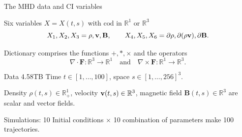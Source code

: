 \documentclass{beamer}
\begin{document}
\begin{frame}{The MHD data and CI variables }%
\begin{block}{Six variables $X = X(t,s)$ with $\text{cod}$ in $\mathbb{R}^1$ or $\mathbb{R}^3$}
\[
X_1, X_2, X_3= \rho, \mathbf{v}, \mathbf{B},
\qquad
X_4, X_5, X_6 = \partial\rho, \partial(\rho\mathbf{v}), \partial\mathbf{B}.
\]
\end{block}
\begin{block}{Dictionary}
comprises the  functions $+, *, \times$ and the operators 
\[
\nabla \cdot \mathbf{F}: \mathbb{R}^3 \to \mathbb{R}^1 \quad\text{and}\quad \nabla \times \mathbf{F}: \mathbb{R}^1 \to \mathbb{R}^3.
\]
\end{block}
\begin{block}{Data 4.58TB}
Time $t \in [1,\dots,100]$, space $s \in [1,\dots,256]^3$.  

\medskip
Density $\rho(t,s)\in\mathbb{R}^1_+$, velocity $\mathbf{v}(t,s)\in\mathbb{R}^3$, magnetic field $\mathbf{B}(t,s)\in\mathbb{R}^3$ are scalar and vector fields.

\medskip
Simulations: 10 Initial conditions $\times$ 10 combination of parameters make 100 trajectories.
\end{block}
\end{frame}
\end{document}
